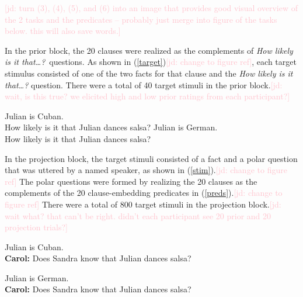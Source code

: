 \documentclass[11pt,fleqn]{article}
\newcommand{\jd}[1]{\textcolor{Pink}{[jd: #1]}}
\newcommand{\6}{\mbox{$[\hspace*{-.6mm}[$}}
\newcommand{\9}{\mbox{$]\hspace*{-.6mm}]$}}
\begin{document}

\jd{turn (3), (4), (5), and (6) into an image that provides good visual overview of the 2 tasks and the predicates -- probably just merge into figure of the tasks below. this will also save words.}

In the prior block, the 20 clauses were realized as the complements of {\em How likely is it that\ldots?}~questions. As shown in (\ref{target})\jd{change to figure ref}, each target stimulus consisted of one of the two facts for that clause and the {\em How likely is it that\ldots?} question. There were a total of 40 target stimuli in the prior block.\jd{wait, is this true? we elicited high and low prior ratings from each participant?}

\begin{exe}
\ex\label{target}  %
\begin{xlist}
 Julian is Cuban. \\ How likely is it that Julian dances salsa?
 Julian is German.  \\ How likely is it that Julian dances salsa?
\end{xlist}
\end{exe}

In the projection block, the target stimuli consisted of a fact and a polar question that was uttered by a named speaker, as shown in (\ref{stim}).\jd{change to figure ref} The polar questions were formed by realizing the 20 clauses as the complements of the 20 clause-embedding predicates in (\ref{preds}).\jd{change to figure ref}   There were a total of 800 target stimuli in the projection block.\jd{wait what? that can't be right. didn't each participant see 20 prior and 20 projection trials?}

\begin{exe}
\ex\label{stim} %
\begin{xlist}
 Julian is Cuban.  \\ 
{\bf Carol:} Does Sandra know that Julian dances salsa?

 Julian is German.  \\ 
{\bf Carol:} Does Sandra know that Julian dances salsa?
\end{xlist}
\end{exe}
\end{document}
